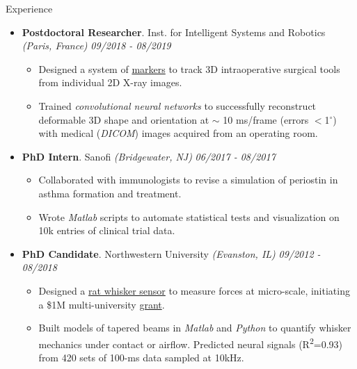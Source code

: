 \documentclass{resume} %
\begin{document}
\begin{rSection}{Experience}
\begin{itemize}[leftmargin=0em]
			\item {\bf Postdoctoral Researcher}{. Inst. for Intelligent Systems and Robotics \textit{(Paris, France)}} \hfill {\em 09/2018 - 08/2019}\\
			\vspace{-5mm}
			\begin{itemize}
				\setlength\itemsep{-1.75em}
				\item  Designed a system of \href{https://tinyurl.com/yxk4jou4}{markers} to track 3D intraoperative surgical tools from individual 2D X-ray images.\\ 
				\item  Trained \textit{convolutional neural networks} to successfully reconstruct deformable 3D shape and orientation at $\sim$ 10 ms/frame (errors $<$1$^\circ$) with medical (\textit{DICOM}) images acquired from an operating room.
			\end{itemize}
			
			\item {\bf PhD Intern}{. Sanofi \textit{(Bridgewater, NJ)}} \hfill {\em 06/2017 - 08/2017}\\
			\vspace{-5mm}
			\begin{itemize}
				\setlength\itemsep{-1.75em}	
				\item Collaborated with immunologists to revise a simulation of periostin in asthma formation and treatment.\\
				\item Wrote \textit{Matlab} scripts to automate statistical tests and visualization on 10k entries of clinical trial data.
			\end{itemize}
			
			\item {\bf PhD Candidate}{. Northwestern University \textit{(Evanston, IL)}} \hfill {\em 09/2012 - 08/2018}\\
			\vspace{-5mm}
			\begin{itemize}
				\setlength\itemsep{-1.75em}
				\item Designed a \href{https://www.youtube.com/watch?v=EPuThXPd-qw}{rat whisker sensor} to measure forces at micro-scale, initiating a \$1M multi-university \href{https://www.nsf.gov/news/mmg/mmg_disp.jsp?med_id=132588}{grant}.\\
				\item Built models of tapered beams in \textit{Matlab} and \textit{Python} to quantify whisker mechanics under contact or airflow. Predicted neural signals (R\textsuperscript{2}=0.93) from 420 sets of 100-ms data sampled at 10kHz.\\
			\end{itemize}
			
			
		\end{itemize}
		
	\end{rSection}
	
\end{document}
